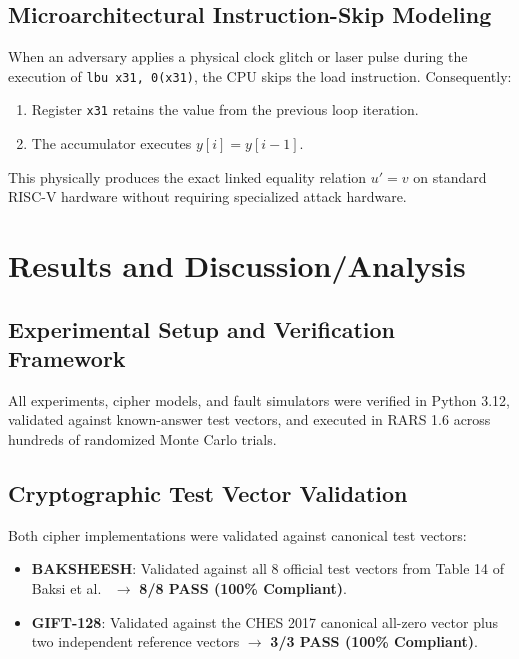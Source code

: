\documentclass[12pt,a4paper,oneside]{report}
\begin{document}
\section{Microarchitectural Instruction-Skip Modeling}
\label{sec:instruction_skip}
When an adversary applies a physical clock glitch or laser pulse during the execution of \texttt{lbu x31, 0(x31)}, the CPU skips the load instruction. Consequently:
\begin{enumerate}
    \item Register \texttt{x31} retains the value from the previous loop iteration.
    \item The accumulator executes $y[i] = y[i-1]$.
\end{enumerate}
This physically produces the exact linked equality relation $u' = v$ on standard RISC-V hardware without requiring specialized attack hardware.

\chapter{Results and Discussion/Analysis}
\label{ch:results}

\section{Experimental Setup and Verification Framework}
\label{sec:exp_setup}
All experiments, cipher models, and fault simulators were verified in Python 3.12, validated against known-answer test vectors, and executed in RARS 1.6 across hundreds of randomized Monte Carlo trials.

\section{Cryptographic Test Vector Validation}
\label{sec:test_vectors}
Both cipher implementations were validated against canonical test vectors:
\begin{itemize}
    \item \textbf{BAKSHEESH}: Validated against all 8 official test vectors from Table 14 of Baksi et al.~\cite{baksi2023baksheesh} $\to$ \textbf{8/8 PASS (100\% Compliant)}.
    \item \textbf{GIFT-128}: Validated against the CHES 2017 canonical all-zero vector plus two independent reference vectors $\to$ \textbf{3/3 PASS (100\% Compliant)}.
\end{itemize}
\end{document}
